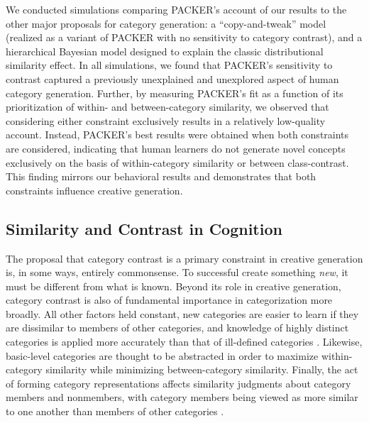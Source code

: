 \documentclass[12pt]{article}
\begin{document}
\begin{flushleft}
We conducted simulations comparing PACKER's account of our results to the other major proposals for category generation: a ``copy-and-tweak'' model (realized as a variant of PACKER with no sensitivity to category contrast), and a hierarchical Bayesian model designed to explain the classic distributional similarity effect. In all simulations, we found that PACKER's sensitivity to contrast captured a previously unexplained and unexplored aspect of human category generation. Further, by measuring PACKER's fit as a function of its prioritization of within- and between-category similarity, we observed that considering either constraint exclusively results in a relatively low-quality account. Instead, PACKER's best results were obtained when both constraints are considered, indicating that human learners do not generate novel concepts exclusively on the basis of within-category similarity or between class-contrast. This finding mirrors our behavioral results and demonstrates that both constraints influence creative generation. 

\subsection{Similarity and Contrast in Cognition}

The proposal that category contrast is a primary constraint in creative generation is, in some ways, entirely commonsense. To successful create something \textit{new}, it must be different from what is known. Beyond its role in creative generation, category contrast is also of fundamental importance in categorization more broadly. All other factors held constant, new categories are easier to learn if they are dissimilar to members of other categories, and knowledge of highly distinct categories is applied more accurately than that of ill-defined categories \citep{ashby1994categorization,imai1965discriminability}. Likewise, basic-level categories \citep{rosch1976basic} are thought to be abstracted in order to maximize within-category similarity while minimizing between-category similarity. Finally, the act of forming category representations affects similarity judgments about category members and nonmembers, with category members being viewed as more similar to one another than members of other categories \citep{goldstone1994influences,goldstone2001altering}.


\end{flushleft}
\end{document}
